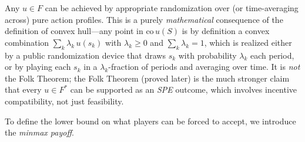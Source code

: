 Any $u \in F$ can be achieved by appropriate randomization over (or time-averaging across) pure action profiles. This is a purely \textit{mathematical} consequence of the definition of convex hull---any point in $\mathrm{co}\, u(S)$ is by definition a convex combination $\sum_k \lambda_k\, u(s_k)$ with $\lambda_k \ge 0$ and $\sum_k \lambda_k = 1$, which is realized either by a public randomization device that draws $s_k$ with probability $\lambda_k$ each period, or by playing each $s_k$ in a $\lambda_k$-fraction of periods and averaging over time. It is \textit{not} the Folk Theorem; the Folk Theorem (proved later) is the much stronger claim that every $u \in F^*$ can be supported as an \textit{SPE} outcome, which involves incentive compatibility, not just feasibility.

To define the lower bound on what players can be forced to accept, we introduce the \textit{minmax payoff}.


